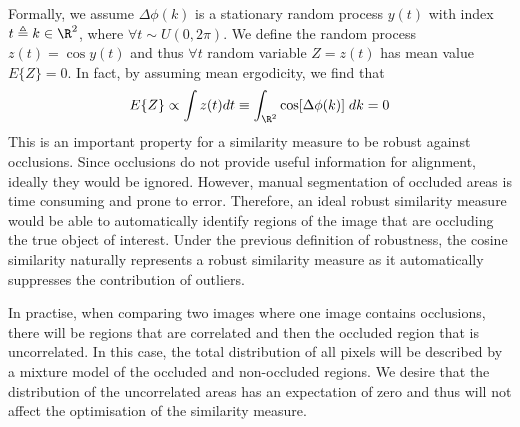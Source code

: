 Formally, we assume $\Delta \phi(k)$ is a stationary random process $y(t)$ with
index $t \triangleq k \in \R^2$, where $\forall t \sim U(0, 2\pi)$. We
define the random process $z(t) = \cos{y(t)}$ and thus $\forall t$ random
variable $Z = z(t)$ has mean value $E\{Z\} = 0$. In fact, by assuming mean
ergodicity, we find that
\begin{equation}\label{eq:cosine_integral}
    E\{Z\} \propto \int z(t) dt \equiv \int_{\R^2} \cos[\Delta \phi(k)] \; dk = 0
\end{equation}
This is an important property for a similarity measure to be robust against
occlusions. Since occlusions do not provide useful information for alignment,
ideally they would be ignored. However, manual segmentation of occluded areas is
time consuming and prone to error. Therefore, an ideal robust similarity measure
would be able to automatically identify regions of the image that are occluding
the true object of interest. Under the previous definition of robustness, the
cosine similarity naturally represents a robust similarity measure as it
automatically suppresses the contribution of outliers.

In practise, when comparing two images where one image contains occlusions,
there will be regions that are correlated and then the occluded region that is
uncorrelated. In this case, the total distribution of all pixels will be
described by a mixture model of the occluded and non-occluded regions. We desire
that the distribution of the uncorrelated areas has an expectation of zero and
thus will not affect the optimisation of the similarity measure.
